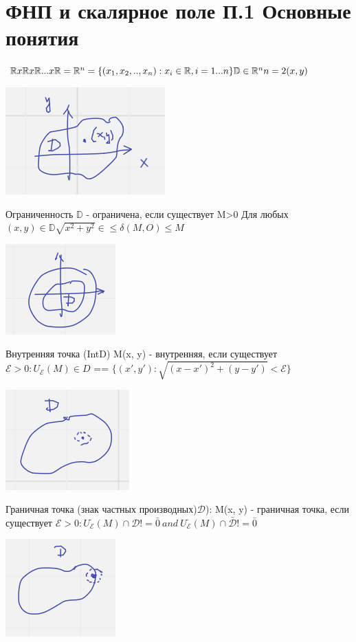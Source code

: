 \documentclass{article}
\begin{document}
\section{ФНП и скалярное поле
П.1 Основные понятия}


$\mathbb{R} x \mathbb{R} x \mathbb{R} ... x \mathbb{R} = \mathbb{R}^n = \{(x_1, x_2, .., x_n): x_i \in \mathbb{R}, i = 1 ... n\}\\
\mathbb{D} \in \mathbb{R}^n \\
n = 2 (x,y)$


\includegraphics[width=.3\textwidth]{1.1} 



Ограниченность $\mathbb{D} $ - ограничена, если существует  M>0 Для любых $(x, y) \in \mathbb{D} \sqrt{x^2+y^2}\in \leq \delta(M, O) \leq M$

\includegraphics[width=.3\textwidth]{1.2} 

Внутренняя точка (IntD) M(x, y) - внутренняя, если существует $\mathcal{E} > 0 : U_{\mathcal{E}}(M) \in D $ == $\{(x', y'): \sqrt{(x-x')^2+(y-y')} < \mathcal{E}\}$

\includegraphics[width=.3\textwidth]{1.3} 

Граничная точка (знак частных производных)$\mathcal{D}$): M(x, y)
- граничная точка, если существует $\mathcal{E} > 0 : U^{\cdot}_{\mathcal{E}}(M) \cap \mathcal{D} != \bar{0}\  and\  U^{\cdot}_{\mathcal{E}}(M) \cap \bar{\mathcal{D}} != \bar{0}$


\includegraphics[width=.3\textwidth]{gran} 
\end{document}
